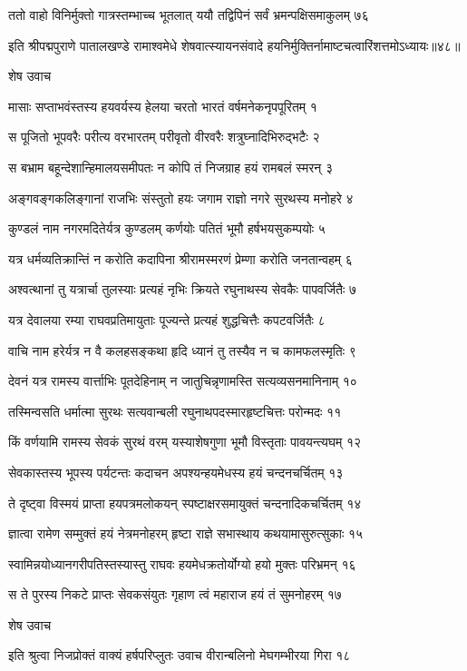 ततो वाहो विनिर्मुक्तो गात्रस्तम्भाच्च भूतलात्
ययौ तद्विपिनं सर्वं भ्रमन्पक्षिसमाकुलम् ७६

इति श्रीपद्मपुराणे पातालखण्डे रामाश्वमेधे शेषवात्स्यायनसंवादे हयनिर्मुक्तिर्नामाष्टचत्वारिंशत्तमोऽध्यायः॥४८॥


शेष उवाच

मासाः सप्ताभवंस्तस्य हयवर्यस्य हेलया
चरतो भारतं वर्षमनेकनृपपूरितम् १

स पूजितो भूपवरैः परीत्य वरभारतम्
परीवृतो वीरवरैः शत्रुघ्नादिभिरुद्भटैः २

स बभ्राम बहून्देशान्हिमालयसमीपतः
न कोपि तं निजग्राह हयं रामबलं स्मरन् ३

अङ्गवङ्गकलिङ्गानां राजभिः संस्तुतो हयः
जगाम राज्ञो नगरे सुरथस्य मनोहरे ४

कुण्डलं नाम नगरमदितेर्यत्र कुण्डलम्
कर्णयोः पतितं भूमौ हर्षभयसुकम्पयोः ५

यत्र धर्मव्यतिक्रान्तिं न करोति कदापिना
श्रीरामस्मरणं प्रेम्णा करोति जनतान्वहम् ६

अश्वत्थानां तु यत्रार्चा तुलस्याः प्रत्यहं नृभिः
क्रियते रघुनाथस्य सेवकैः पापवर्जितैः ७

यत्र देवालया रम्या राघवप्रतिमायुताः
पूज्यन्ते प्रत्यहं शुद्धचित्तैः कपटवर्जितैः ८

वाचि नाम हरेर्यत्र न वै कलहसङ्कथा
हृदि ध्यानं तु तस्यैव न च कामफलस्मृतिः ९

देवनं यत्र रामस्य वार्त्ताभिः पूतदेहिनाम्
न जातुचिन्नृणामस्ति सत्यव्यसनमानिनाम् १०

तस्मिन्वसति धर्मात्मा सुरथः सत्यवान्बली
रघुनाथपदस्मारहृष्टचित्तः परोन्मदः ११

किं वर्णयामि रामस्य सेवकं सुरथं वरम्
यस्याशेषगुणा भूमौ विस्तृताः पावयन्त्यघम् १२

सेवकास्तस्य भूपस्य पर्यटन्तः कदाचन
अपश्यन्हयमेधस्य हयं चन्दनचर्चितम् १३

ते दृष्ट्वा विस्मयं प्राप्ता हयपत्रमलोकयन्
स्पष्टाक्षरसमायुक्तं चन्दनादिकचर्चितम् १४

ज्ञात्वा रामेण सम्मुक्तं हयं नेत्रमनोहरम्
हृष्टा राज्ञे सभास्थाय कथयामासुरुत्सुकाः १५

स्वामिन्नयोध्यानगरीपतिस्तस्यास्तु राघवः
हयमेधक्रतोर्योग्यो हयो मुक्तः परिभ्रमन् १६

स ते पुरस्य निकटे प्राप्तः सेवकसंयुतः
गृहाण त्वं महाराज हयं तं सुमनोहरम् १७

शेष उवाच

इति श्रुत्वा निजप्रोक्तं वाक्यं हर्षपरिप्लुतः
उवाच वीरान्बलिनो मेघगम्भीरया गिरा १८


